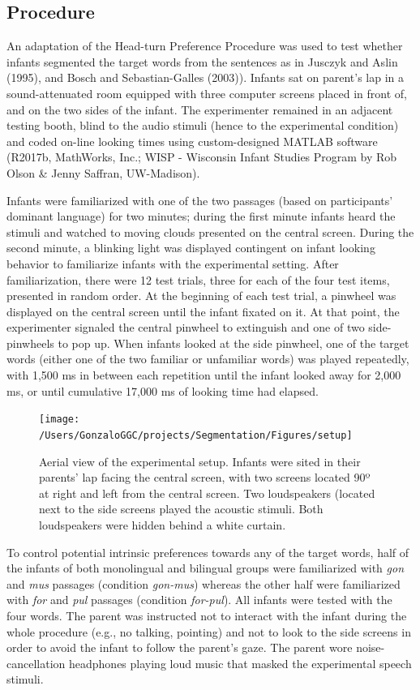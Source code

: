 \documentclass[man,floatsintext]{apa6}
\begin{document}
\hypertarget{procedure}{%
\subsection{Procedure}\label{procedure}}

An adaptation of the Head-turn Preference Procedure was used to test whether infants segmented the target words from the sentences as in Jusczyk and Aslin (1995), and Bosch and Sebastian-Galles (2003)). Infants sat on parent's lap in a sound-attenuated room equipped with three computer screens placed in front of, and on the two sides of the infant. The experimenter remained in an adjacent testing booth, blind to the audio stimuli (hence to the experimental condition) and coded on-line looking times using custom-designed MATLAB software (R2017b, MathWorks, Inc.; WISP - Wisconsin Infant Studies Program by Rob Olson \& Jenny Saffran, UW-Madison).

Infants were familiarized with one of the two passages (based on participants' dominant language) for two minutes; during the first minute infants heard the stimuli and watched to moving clouds presented on the central screen. During the second minute, a blinking light was displayed contingent on infant looking behavior to familiarize infants with the experimental setting. After familiarization, there were 12 test trials, three for each of the four test items, presented in random order. At the beginning of each test trial, a pinwheel was displayed on the central screen until the infant fixated on it. At that point, the experimenter signaled the central pinwheel to extinguish and one of two side-pinwheels to pop up. When infants looked at the side pinwheel, one of the target words (either one of the two familiar or unfamiliar words) was played repeatedly, with 1,500 ms in between each repetition until the infant looked away for 2,000 ms, or until cumulative 17,000 ms of looking time had elapsed.

\begin{figure}
\texttt{[image: /Users/GonzaloGGC/projects/Segmentation/Figures/setup]} \caption{Aerial view of the experimental setup. Infants were sited in their parents' lap facing the central screen, with two screens located 90º at right and left from the central screen. Two loudspeakers (located next to the side screens played the acoustic stimuli. Both loudspeakers were hidden behind a white curtain.}\label{fig:hpp}
\end{figure}

To control potential intrinsic preferences towards any of the target words, half of the infants of both monolingual and bilingual groups were familiarized with \emph{gon} and \emph{mus} passages (condition \emph{gon-mus}) whereas the other half were familiarized with \emph{for} and \emph{pul} passages (condition \emph{for-pul}). All infants were tested with the four words. The parent was instructed not to interact with the infant during the whole procedure (e.g., no talking, pointing) and not to look to the side screens in order to avoid the infant to follow the parent's gaze. The parent wore noise-cancellation headphones playing loud music that masked the experimental speech stimuli.
\end{document}

